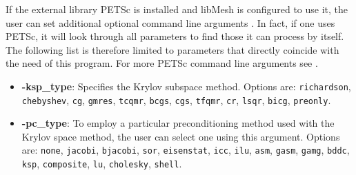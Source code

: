   If the external library PETSc is installed and libMesh is configured to use it, the user can set additional optional command line arguments \cite{petsc-user-ref}. In fact, if one uses PETSc, it will look through all parameters to find those it can process by itself. The following list is therefore limited to parameters that directly coincide with the need of this program. For more PETSc command line arguments see \cite{petsc-user-ref}.
  \begin{itemize}
  	\item \textbf{-ksp\_type}: Specifies the Krylov subspace method. Options are: \texttt{richardson}, \texttt{chebyshev}, \texttt{cg}, \texttt{gmres}, \texttt{tcqmr}, \texttt{bcgs}, \texttt{cgs}, \texttt{tfqmr}, \texttt{cr}, \texttt{lsqr}, \texttt{bicg}, \texttt{preonly}.
  	\item \textbf{-pc\_type}: To employ a particular preconditioning method used with the Krylov space method, the user can select one using this argument. Options are: \texttt{none}, \texttt{jacobi}, \texttt{bjacobi}, \texttt{sor}, \texttt{eisenstat}, \texttt{icc}, \texttt{ilu}, \texttt{asm}, \texttt{gasm}, \texttt{gamg}, \texttt{bddc}, \texttt{ksp}, \texttt{composite}, \texttt{lu}, \texttt{cholesky}, \texttt{shell}. 
  \end{itemize}
   
   
   
